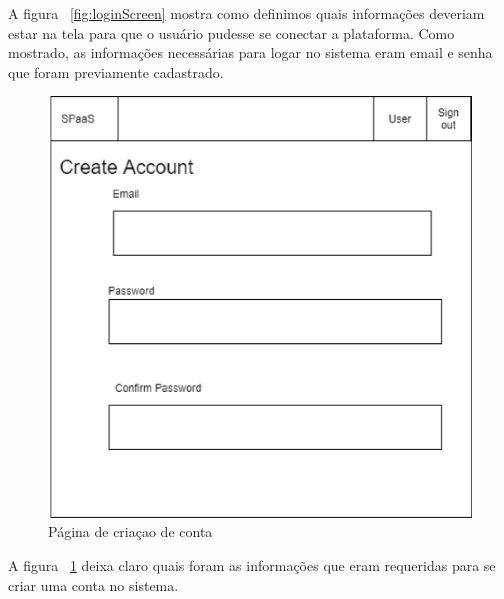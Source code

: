 \documentclass[11pt,twoside]{article}
\begin{document}
A figura ~\ref{fig:loginScreen} mostra como definimos quais informações deveriam estar na tela para que o usuário pudesse se conectar a plataforma. Como mostrado, 
as informações necessárias para logar no sistema eram email e senha que foram previamente cadastrado.

\begin{figure}[!h]
  \centering
  \includegraphics[scale=0.4]{account_reg.eps}
  \caption{Página de criaçao de conta}
  \label{fig:createScreen}
\end{figure}

A figura ~\ref{fig:createScreen} deixa claro quais foram as informações que eram requeridas para se criar uma conta no sistema. 
\end{document}

